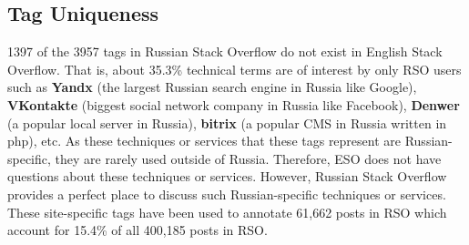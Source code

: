 \subsection{Tag Uniqueness}
1397 of the 3957 tags in Russian Stack Overflow do not exist in English Stack Overflow.
That is, about 35.3\% technical terms are of interest by only RSO users such as \textbf{Yandx} (the largest Russian search engine in Russia like Google), \textbf{VKontakte} (biggest social network company in Russia like Facebook), \textbf{Denwer} (a popular local server in Russia), \textbf{bitrix} (a popular CMS in Russia written in php), etc.
As these techniques or services that these tags represent are Russian-specific, they are rarely used outside of Russia.
Therefore, ESO does not have questions about these techniques or services.
However, Russian Stack Overflow provides a perfect place to discuss such Russian-specific techniques or services.
These site-specific tags have been used to annotate 61,662 posts in RSO which account for 15.4\% of all 400,185 posts in RSO.

